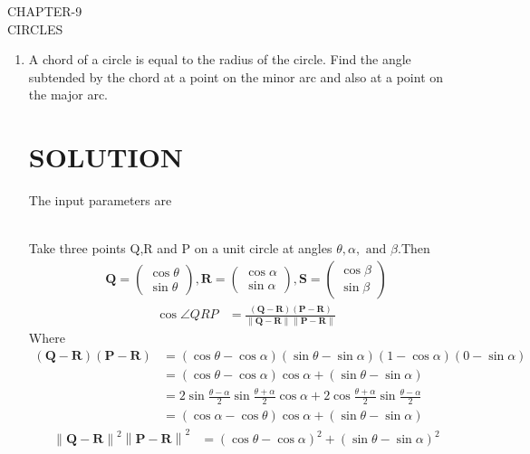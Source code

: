 \documentclass[12pt]{article}
\providecommand{\brak}[1]{\ensuremath{\left(#1\right)}}
\providecommand{\norm}[1]{\left\lVert#1\right\rVert}
\newcommand{\myvec}[1]{\ensuremath{\begin{pmatrix}#1\end{pmatrix}}}
\let\vec\mathbf
\begin{document}
\begin{center}
\textbf\large{CHAPTER-9 \\ CIRCLES}

\end{center}
\begin{enumerate}
\section{EXERCISE-10.5}
\item A chord of a circle is equal to the radius of the circle. Find the angle subtended by the chord at a point on the minor arc and also at a point on the major arc.
\section{SOLUTION}
The input parameters are\\
\begin{table}[h!]
	
\caption{}
\label{table}	
\end{table}
\\
Take three points Q,R and P on a unit circle  at angles $\theta,\alpha,\text{ and }\beta$.Then
\begin{align}
	\vec{Q} = \myvec{\cos\theta\\ \sin\theta},
	\vec{R} = \myvec{\cos\alpha\\ \sin\alpha},
	\vec{S} = \myvec{\cos\beta\\ \sin\beta}
\end{align}
\begin{align}
	\cos\angle QRP&= \frac{\brak{\vec{Q}-\vec{R}}\brak{\vec{P}-\vec{R}}}{\norm{\vec{Q}-\vec{R}}\norm{\vec{P}-\vec{R}}}\label{eq:2}
\end{align}
Where
\begin{align}
\brak{\vec{Q}-\vec{R}}\brak{\vec{P}-\vec{R}}&= \brak{\cos\theta-\cos\alpha}\brak{ \sin\theta-\sin\alpha}\brak{1-\cos\alpha}\brak{0-\sin\alpha}\\
&=\brak{\cos\theta-\cos\alpha}\cos\alpha+\brak{\sin\theta-\sin\alpha}\\
&=2\sin\frac{\theta-\alpha}{2}\sin\frac{\theta+\alpha}{2}\cos\alpha+2\cos\frac{\theta+\alpha}{2}\sin\frac{\theta-\alpha}{2}\\
&=\brak{\cos\alpha-\cos\theta}\cos\alpha+\brak{\sin\theta-\sin\alpha}\label{eq:6}
\end{align}
\begin{align}
\norm{\vec{Q}-\vec{R}}^2\norm{\vec{P}-\vec{R}}^2 &= \brak{\cos\theta-\cos\alpha}^2+\brak{\sin\theta-\sin\alpha}^2

\end{align}
\end{enumerate}
\end{document}
